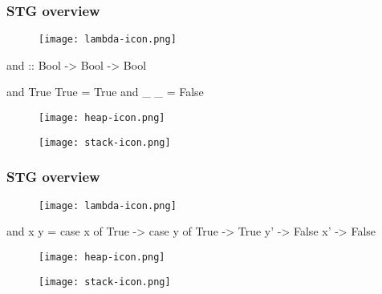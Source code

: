 \documentclass[bigger]{beamer}
\begin{document}
\begin{frame}[fragile]
\frametitle{STG overview}
\begin{center}

	\begin{minipage}{0.30\textwidth}
		\vspace{1cm}
		\begin{figure}
			\texttt{[image: lambda-icon.png]}
		\end{figure}
		\begin{haskellcode}
			and :: Bool -> Bool -> Bool
		\end{haskellcode}
		\vspace{-0.4cm}
		\begin{haskellcode}
			and True True = True
			and _    _    = False
		\end{haskellcode}
	\end{minipage}
	\hfill
	\begin{minipage}{0.30\textwidth}
		\begin{figure}
			\texttt{[image: heap-icon.png]}
		\end{figure}
	\end{minipage}
	\hfill
	\begin{minipage}{0.30\textwidth}
		\begin{figure}
			\texttt{[image: stack-icon.png]}
		\end{figure}
	\end{minipage}

\end{center}
\end{frame}

\begin{frame}[fragile]
\frametitle{STG overview}
\begin{center}

	\begin{minipage}{0.30\textwidth}
		\vspace{1.8cm}
		\begin{figure}
			\texttt{[image: lambda-icon.png]}
		\end{figure}
		\begin{haskellcode}
			and x y = case x of
			  True -> case y of
			    True -> True
			    y' -> False
			  x' -> False
		\end{haskellcode}
	\end{minipage}
	\hfill
	\begin{minipage}{0.30\textwidth}
		\begin{figure}
			\texttt{[image: heap-icon.png]}
		\end{figure}
	\end{minipage}
	\hfill
	\begin{minipage}{0.30\textwidth}
		\begin{figure}
			\texttt{[image: stack-icon.png]}
		\end{figure}
	\end{minipage}

\end{center}
\end{frame}
\end{document}
